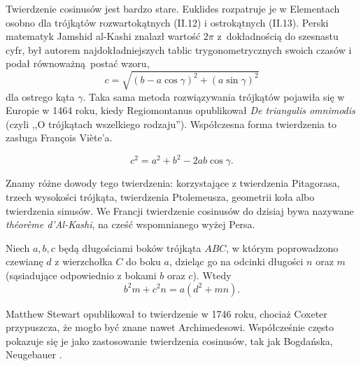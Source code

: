 Twierdzenie cosinusów jest bardzo stare.
Euklides rozpatruje je w Elementach osobno dla trójkątów rozwartokątnych (II.12) i ostrokątnych (II.13).
Perski matematyk Jamshid al-Kashi znalazł wartość $2\pi$ z~dokładnością do szesnastu cyfr, był autorem najdokładniejszych tablic trygonometrycznych swoich czasów i podał równoważną postać wzoru,
\begin{equation}
	c = \sqrt{(b - a \cos \gamma)^2 + (a \sin \gamma)^2}
\end{equation}
dla ostrego kąta $\gamma$.
Taka sama metoda rozwiązywania trójkątów pojawiła się w Europie w 1464 roku, kiedy Regiomontanus opublikował \emph{De triangulis omnimodis} (czyli ,,O trójkątach wszelkiego rodzaju'').
%
Współczesna forma twierdzenia to zasługa François Viète'a.
%

\begin{proposition}
	\label{twierdzenie_cosinusow}%
	\begin{equation}
		c^2 = a^2 + b^2 - 2ab \cos \gamma.
	\end{equation}
\end{proposition}

Znamy różne dowody tego twierdzenia: korzystające z twierdzenia Pitagorasa, trzech wysokości trójkąta, twierdzenia Ptolemeusza, geometrii koła albo twierdzenia sinusów.
We Francji twierdzenie cosinusów do dzisiaj bywa nazywane \emph{théorème d'Al-Kashi}, na cześć wspomnianego wyżej Persa.

\begin{theorem}[Stewarta, 1746]
	Niech $a, b, c$ będą długościami boków trójkąta $ABC$, w którym poprowadzono czewianę $d$ z wierzchołka $C$ do boku $a$, dzieląc go na odcinki długości $n$ oraz $m$ (sąsiadujące odpowiednio z bokami $b$ oraz $c$).
	Wtedy
	\begin{equation}
		b^2 m + c^2 n = a (d^2 + mn).
	\end{equation}
\end{theorem}

Matthew Stewart opublikował to twierdzenie w 1746 roku, chociaż Coxeter przypuszcza, że mogło być znane nawet Archimedesowi.
%
%
Współcześnie często pokazuje się je jako zastosowanie twierdzenia cosinusów, tak jak Bogdańska, Neugebauer \cite[s. 90-91]{neugebauer_2018}.	

